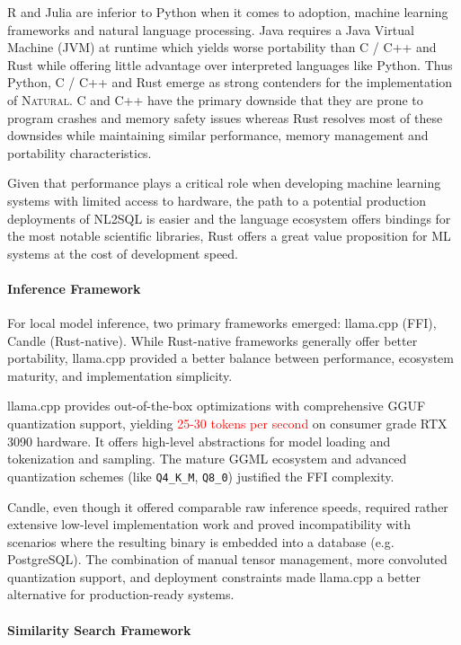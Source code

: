 R and Julia are inferior to Python when it comes to adoption, machine learning
frameworks and natural language processing. Java requires a Java Virtual
Machine (JVM) at runtime which yields worse portability than C / C++ and Rust
while offering little advantage over interpreted languages like Python. Thus
Python, C / C++ and Rust emerge as strong contenders for the implementation of
\textsc{Natural}. C and C++ have the primary downside that they are prone to
program crashes and memory safety issues whereas Rust resolves most of these
downsides while maintaining similar performance, memory management and
portability characteristics.

Given that performance plays a critical role when developing machine learning
systems with limited access to hardware, the path to a potential production
deployments of NL2SQL is easier and the language ecosystem offers bindings
for the most notable scientific libraries, Rust offers a great value
proposition for ML systems at the cost of development speed.

\paragraph{Inference Framework}

For local model inference, two primary frameworks emerged: llama.cpp (FFI), 
Candle (Rust-native). While Rust-native frameworks generally offer better 
portability, llama.cpp provided a better balance between performance, ecosystem 
maturity, and implementation simplicity.

llama.cpp provides out-of-the-box optimizations with comprehensive GGUF 
quantization support, yielding \textcolor{red}{25-30 tokens per second} on
consumer grade RTX 3090 hardware. It offers high-level abstractions for model
loading and tokenization and sampling. The mature GGML ecosystem and advanced
quantization schemes (like \texttt{Q4\_K\_M}, \texttt{Q8\_0}) justified the FFI
complexity.

Candle, even though it offered comparable raw inference speeds, required
rather extensive low-level implementation work and proved incompatibility with
scenarios where the resulting binary is embedded into a database (e.g. PostgreSQL).
The combination of manual tensor management, more convoluted quantization support,
and deployment constraints made llama.cpp a better alternative for
production-ready systems.

\paragraph{Similarity Search Framework}

